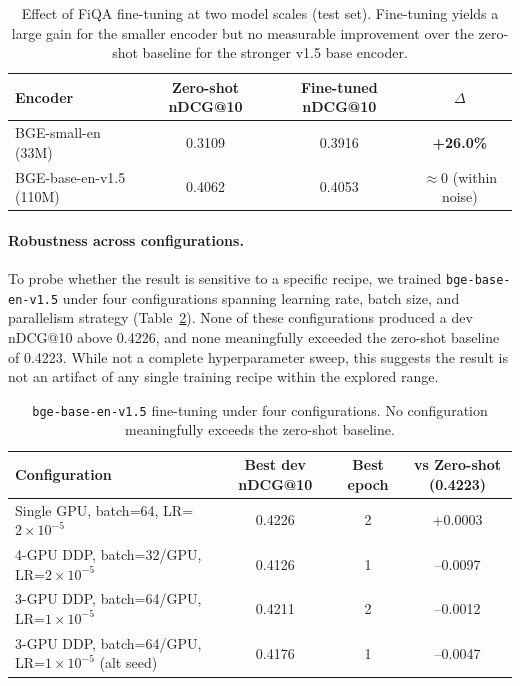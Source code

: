\documentclass{article} %
\begin{document}
\begin{table}[t]
    \centering
    \scriptsize
    \begin{tabular}{lccc}
        \toprule
        Encoder & Zero-shot nDCG@10 & Fine-tuned nDCG@10 & $\Delta$ \\
        \midrule
        BGE-small-en (33M) & 0.3109 & 0.3916 & \textbf{+26.0\%} \\
        BGE-base-en-v1.5 (110M) & 0.4062 & 0.4053 & $\approx 0$ (within noise) \\
        \bottomrule
    \end{tabular}
    \caption{Effect of FiQA fine-tuning at two model scales (test set). Fine-tuning yields a large gain for the smaller encoder but no measurable improvement over the zero-shot baseline for the stronger v1.5 base encoder.}
    \label{tab:scaling_finetune}
\end{table}

\paragraph{Robustness across configurations.}
To probe whether the result is sensitive to a specific recipe, we trained \texttt{bge-base-en-v1.5} under four configurations spanning learning rate, batch size, and parallelism strategy (Table~\ref{tab:base_runs}).
None of these configurations produced a dev nDCG@10 above 0.4226, and none meaningfully exceeded the zero-shot baseline of 0.4223.
While not a complete hyperparameter sweep, this suggests the result is not an artifact of any single training recipe within the explored range.

\begin{table}[t]
    \centering
    \scriptsize
    \begin{tabular}{lccc}
        \toprule
        Configuration & Best dev nDCG@10 & Best epoch & vs Zero-shot (0.4223) \\
        \midrule
        Single GPU, batch=64, LR=$2\times10^{-5}$  & 0.4226 & 2 & +0.0003 \\
        4-GPU DDP, batch=32/GPU, LR=$2\times10^{-5}$ & 0.4126 & 1 & --0.0097 \\
        3-GPU DDP, batch=64/GPU, LR=$1\times10^{-5}$ & 0.4211 & 2 & --0.0012 \\
        3-GPU DDP, batch=64/GPU, LR=$1\times10^{-5}$ (alt seed) & 0.4176 & 1 & --0.0047 \\
        \bottomrule
    \end{tabular}
    \caption{\texttt{bge-base-en-v1.5} fine-tuning under four configurations. No configuration meaningfully exceeds the zero-shot baseline.}
    \label{tab:base_runs}
\end{table}
\end{document}
